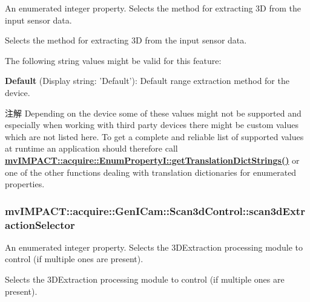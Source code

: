 An enumerated integer property. Selects the method for extracting 3\+D from the input sensor data. 

Selects the method for extracting 3\+D from the input sensor data.

The following string values might be valid for this feature\+:
\begin{DoxyItemize}
\item {\bfseries Default} (Display string\+: 'Default')\+: Default range extraction method for the device.
\end{DoxyItemize}

\begin{DoxyNote}{注解}
Depending on the device some of these values might not be supported and especially when working with third party devices there might be custom values which are not listed here. To get a complete and reliable list of supported values at runtime an application should therefore call {\bfseries \hyperlink{classmv_i_m_p_a_c_t_1_1acquire_1_1_enum_property_i_a0ba6ccbf5ee69784d5d0b537924d26b6}{mv\+I\+M\+P\+A\+C\+T\+::acquire\+::\+Enum\+Property\+I\+::get\+Translation\+Dict\+Strings()}} or one of the other functions dealing with translation dictionaries for enumerated properties. 
\end{DoxyNote}
\hypertarget{classmv_i_m_p_a_c_t_1_1acquire_1_1_gen_i_cam_1_1_scan3d_control_a025778e70e151c604f938a48dc962a0c}{
\subsubsection[{scan3d\+Extraction\+Selector}]{ mv\+I\+M\+P\+A\+C\+T\+::acquire\+::\+Gen\+I\+Cam\+::\+Scan3d\+Control\+::scan3d\+Extraction\+Selector}}\label{classmv_i_m_p_a_c_t_1_1acquire_1_1_gen_i_cam_1_1_scan3d_control_a025778e70e151c604f938a48dc962a0c}


An enumerated integer property. Selects the 3\+D\+Extraction processing module to control (if multiple ones are present). 

Selects the 3\+D\+Extraction processing module to control (if multiple ones are present).

